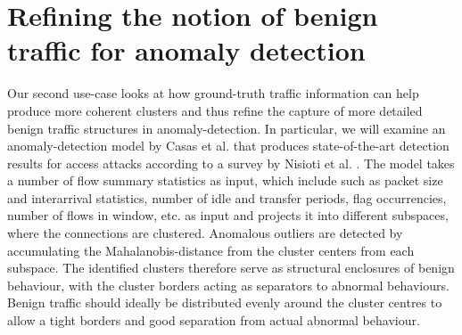 \documentclass[conference]{IEEEtran}
\begin{document}




\section{Refining the notion of benign traffic for anomaly detection}

Our second use-case looks at how ground-truth traffic information can help produce more coherent clusters and thus refine the capture of more detailed benign traffic structures in anomaly-detection. In particular, we will examine an anomaly-detection model by Casas et al. \cite{casas2012unsupervised} that produces state-of-the-art detection results for access attacks according to a survey by Nisioti et al. \cite{nisioti2018intrusion}.
The model takes a number of flow summary statistics as input, which include such as packet size and interarrival statistics, number of idle and transfer periods, flag occurrencies, number of flows in window, etc. as input and projects it into different subspaces, where the connections are clustered. Anomalous outliers are detected by accumulating the Mahalanobis-distance from the cluster centers from each subspace. The identified clusters therefore serve as structural enclosures of benign behaviour, with the cluster borders acting as separators to abnormal behaviours. Benign traffic should ideally be distributed evenly around the cluster centres to allow a tight borders and good separation from actual abnormal behaviour.
\end{document}
